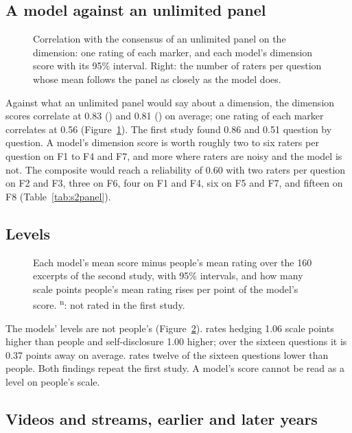 \subsection{A model against an unlimited panel}\label{sec:panel}

\begin{figure}[!htb]\centering

\caption{Correlation with the consensus of an unlimited panel on the dimension: one rating of each marker, and
each model's dimension score with its 95\% interval. Right: the number of raters per question whose mean follows
the panel as closely as the model does.}\label{fig:s2panel}
\end{figure}

Against what an unlimited panel would say about a dimension, the dimension scores correlate at 0.83 (\jev{}) and
0.81 (\drex{}) on average; one rating of each marker correlates at 0.56 (Figure~\ref{fig:s2panel}). The first
study found 0.86 and 0.51 question by question. A model's dimension score is worth roughly two to six raters per
question on F1 to F4 and F7, and more where raters are noisy and the model is not. The composite would reach a
reliability of 0.60 with two raters per question on F2 and F3, three on F6, four on F1 and F4, six on F5 and F7,
and fifteen on F8 (Table~\ref{tab:s2panel}).

\subsection{Levels}\label{sec:levels}

\begin{figure}[!htb]\centering

\caption{Each model's mean score minus people's mean rating over the 160 excerpts of the second study, with 95\%
intervals, and how many scale points people's mean rating rises per point of the model's score.
\textsuperscript{n}: not rated in the first study.}\label{fig:s2levels}
\end{figure}

The models' levels are not people's (Figure~\ref{fig:s2levels}). \jev{} rates hedging 1.06 scale points higher
than people and self-disclosure 1.00 higher; over the sixteen questions it is 0.37 points away on average.
\drex{} rates twelve of the sixteen questions lower than people. Both findings repeat the first study. A
model's score cannot be read as a level on people's scale.

\subsection{Videos and streams, earlier and later years}\label{sec:groups}

